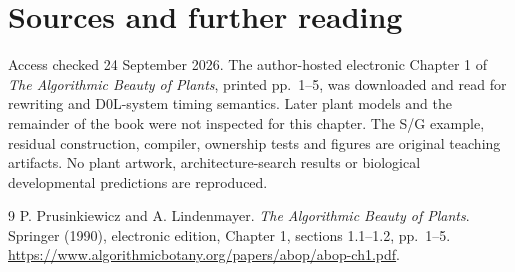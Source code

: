 \chapter*{Sources and further reading}
Access checked 24 September 2026. The author-hosted electronic Chapter 1 of
\emph{The Algorithmic Beauty of Plants}, printed pp.~1--5, was downloaded and
read for rewriting and D0L-system timing semantics. Later plant models and
the remainder of the book were not inspected for this chapter.
The S/G example, residual construction, compiler, ownership tests and figures
are original teaching artifacts. No plant artwork, architecture-search results
or biological developmental predictions are reproduced.
\begingroup\let\chapter\section
\begin{thebibliography}{9}
 P. Prusinkiewicz and A. Lindenmayer.
\emph{The Algorithmic Beauty of Plants}. Springer (1990), electronic edition,
Chapter 1, sections 1.1--1.2, pp.~1--5.
\url{https://www.algorithmicbotany.org/papers/abop/abop-ch1.pdf}.
\end{thebibliography}\endgroup
